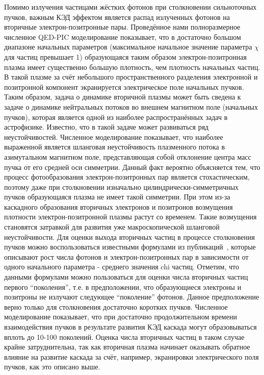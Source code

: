 Помимо излучения частицами жёстких фотонов при столкновении сильноточных пучков, важным КЭД эффектом является распад излученных фотонов на вторичные электрон-позитронные пары.
Проведённое нами полноразмерное численное QED-PIC моделирование показывает, что в достаточно большом диапазоне начальных параметров (максимальное начальное значение параметра $\chi$ для частиц превышает 1) образующаяся таким образом электрон-позитронная плазма имеет существенно большую плотность, чем плотность начальных частиц.
В такой плазме за счёт небольшого пространственного разделения электронной и позитронной компонент экранируется электрическое поле начальных пучков.
Таким образом, задача о динамике вторичной плазмы может быть сведена к задаче о динамике нейтральных потоков во внешнем магнитном поле (начальных пучков), которая является одной из наиболее распространённых задач в астрофизике.
Известно, что в такой задаче может развиваться ряд неустойчивостей.
Численное моделирование показывает, что наиболее выраженной является шланговая неустойчивость плазменного потока в азимутальном магнитном поле, представляющая собой отклонение центра масс пучка от его средней оси симметрии.
Данный факт вероятно объясняется тем, что процесс фотообразования электрон-позитронных пар является стохастическим, поэтому даже при столкновении изначально цилиндрически-симметричных пучков образующаяся плазма не имеет такой симметрии.
При этом из-за каскадного образования вторичных электронов и позитронов возмущения плотности электрон-позитронной плазмы растут со временем.
Такие возмущения становятся затравкой для развития уже макроскопической шланговой неустойчивости.
Для оценки выхода вторичных частиц в процессе столкновения пучков можно воспользоваться известными формулами из публикаций~\cite{yokoya1992beam, chen1989coherent}, которые описывают рост числа фотонов и электрон-позитронных пар в зависимости от одного начального параметра - среднего значения chi частиц.
Отметим, что данными формулами можно пользоваться для оценки числа вторичных частиц первого “поколения”, т.е. в предположении, что образующиеся электроны и позитроны не излучают следующее “поколение” фотонов.
Данное предположение верно только для столкновения достаточно коротких пучков.
Численное моделирование показывает, что при достаточно продолжительном времени взаимодействия пучков в результате развития КЭД каскада могут образовываться вплоть до 10-100 поколений.
Оценка числа вторичных частиц в таком случае крайне затруднительна, так как вторичная плазма начинает оказывать обратное влияние на развитие каскада за счёт, например, экранировки электрического поля пучков, как это описано выше.

